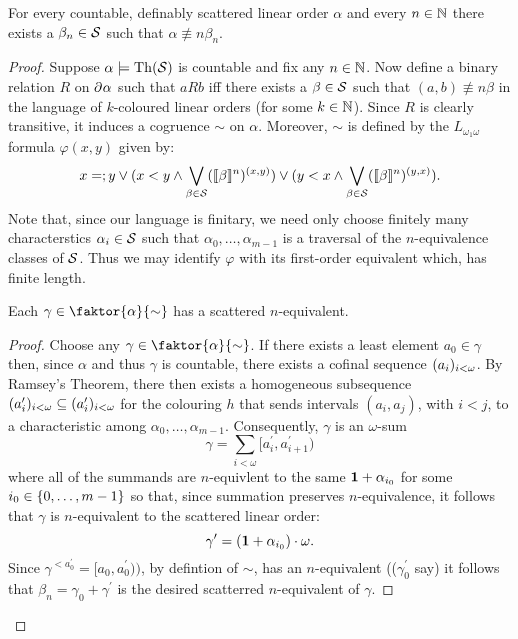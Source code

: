 \begin{thm}
	For every countable, definably scattered linear order $\alpha$ and every  $n\in\mathbb{N}$ there exists a $\beta_n\in\mathcal{S}$ such that $\alpha\nequiv{n}\beta_n$.
\end{thm}
\begin{proof}
	Suppose $\alpha\models\operatorname{Th}(\mathcal{S})$ is countable and fix any $n\in\mathbb{N}$.  Now define a binary relation $R$ on $\partial^{}\alpha$ such that $aRb$ iff there exists a $\beta\in\mathcal{S}$ such that $(a,b)\nequiv{n}\beta$ in the language of $k$-coloured linear orders (for some $k\in\mathbb{N}$).  Since $R$ is clearly transitive, it induces a cogruence $\sim$ on $\alpha$.  Moreover, $\sim$ is defined by the $L_{\omega_1\omega}$ formula $\varphi(x,y)$ given by:
	\begin{equation}
		x=;y\vee(x<y\wedge\bigvee_{\beta\in\mathcal{S}}(\llbracket\beta\rrbracket^{n})^{(x,y)})\vee(y<x\wedge\bigvee_{\beta\in\mathcal{S}}(\llbracket\beta\rrbracket^{n})^{(y,x)}).
	\end{equation}
	Note that, since our language is finitary, we need only choose finitely many characterstics $\alpha_i\in\mathcal{S}$ such that $\alpha_0,\dotsc,\alpha_{m-1}$ is a traversal of the $n$-equivalence classes of $\mathcal{S}$. Thus we may identify $\varphi$ with its first-order equivalent which, has finite length.

	\begin{claim}\label{clm:LL1}
		Each $\gamma\in\faktor{\alpha}{\sim}$ has a scattered $n$-equivalent.
	\end{claim}
	\begin{proof}
		Choose any $\gamma\in\faktor{\alpha}{\sim}$.  If there exists a least element $a_0\in\gamma$ then, since $\alpha$ and thus $\gamma$ is countable, there exists a cofinal sequence $(a_i)_{i<\omega}$.  By Ramsey's Theorem, there then exists a homogeneous subsequence $(a^\prime_i)_{i<\omega}\subseteq(a^\prime_i)_{i<\omega}$ for the colouring $h$ that sends intervals $(a_i,a_j)$, with $i<j$, to a characteristic among $\alpha_0,\dotsc,\alpha_{m-1}$.  Consequently, $\gamma$ is an $\omega$-sum
		\begin{equation}
			\gamma=\sum_{i<\omega}[a^\prime_i,a^\prime_{i+1})
		\end{equation}
		where all of the summands are $n$-equivlent to the same $\mathbf{1}+\alpha_{i_0}$ for some $i_0\in\left\lbrace 0,\dotsc,m-1\right\rbrace$ so that, since summation preserves $n$-equivalence, it follows that $\gamma$ is $n$-equivalent to the scattered linear order:
		\begin{equation}
			\gamma^\prime=(\mathbf{1}+\alpha_{i_0})\cdot\omega.
		\end{equation}
		Since $\gamma^{<a^\prime_0}=[a_0,a^\prime_0))$, by defintion of $\sim$, has an $n$-equivalent (($\gamma^\prime_0$ say) it follows that $\beta_n=\gamma_0+\gamma^\prime$ is the desired scatterred $n$-equivalent of $\gamma$.


\end{proof}
\end{proof}
